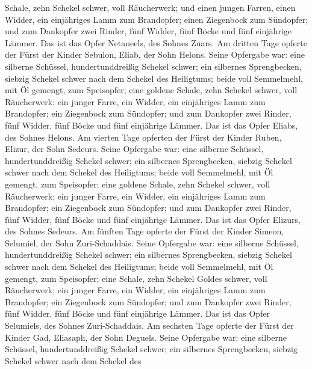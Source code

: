 Schale, zehn Schekel schwer, voll Räucherwerk;  und einen
jungen Farren, einen Widder, ein einjähriges Lamm zum Brandopfer;
 einen Ziegenbock zum Sündopfer;  und zum
Dankopfer zwei Rinder, fünf Widder, fünf Böcke und fünf einjährige
Lämmer. Das ist das Opfer Netaneels, des Sohnes Zuars. 
Am dritten Tage opferte der Fürst der Kinder Sebulon, Eliab, der Sohn
Helons.  Seine Opfergabe war: eine silberne Schüssel,
hundertunddreißig Schekel schwer; ein silbernes Sprengbecken, siebzig
Schekel schwer nach dem Schekel des Heiligtums; beide voll Semmelmehl,
mit Öl gemengt, zum Speisopfer;  eine goldene Schale,
zehn Schekel schwer, voll Räucherwerk;  ein junger Farre,
ein Widder, ein einjähriges Lamm zum Brandopfer;  ein
Ziegenbock zum Sündopfer;  und zum Dankopfer zwei Rinder,
fünf Widder, fünf Böcke und fünf einjährige Lämmer. Das ist das Opfer
Eliabs, des Sohnes Helons.  Am vierten Tage opferten der
Fürst der Kinder Ruben, Elizur, der Sohn Sedeurs.  Seine
Opfergabe war: eine silberne Schüssel, hundertunddreißig Schekel schwer;
ein silbernes Sprengbecken, siebzig Schekel schwer nach dem Schekel des
Heiligtums; beide voll Semmelmehl, mit Öl gemengt, zum Speisopfer;
 eine goldene Schale, zehn Schekel schwer, voll
Räucherwerk;  ein junger Farre, ein Widder, ein
einjähriges Lamm zum Brandopfer;  ein Ziegenbock zum
Sündopfer;  und zum Dankopfer zwei Rinder, fünf Widder,
fünf Böcke und fünf einjährige Lämmer. Das ist das Opfer Elizurs, des
Sohnes Sedeurs.  Am fünften Tage opferte der Fürst der
Kinder Simeon, Selumiel, der Sohn Zuri-Schaddais.  Seine
Opfergabe war: eine silberne Schüssel, hundertunddreißig Schekel schwer;
ein silbernes Sprengbecken, siebzig Schekel schwer nach dem Schekel des
Heiligtums; beide voll Semmelmehl, mit Öl gemengt, zum Speisopfer;
 eine Schale, zehn Schekel Goldes schwer, voll
Räucherwerk;  ein junger Farre, ein Widder, ein
einjähriges Lamm zum Brandopfer;  ein Ziegenbock zum
Sündopfer;  und zum Dankopfer zwei Rinder, fünf Widder,
fünf Böcke und fünf einjährige Lämmer. Das ist das Opfer Selumiels, des
Sohnes Zuri-Schaddais.  Am sechsten Tage opferte der
Fürst der Kinder Gad, Eliasaph, der Sohn Deguels.  Seine
Opfergabe war: eine silberne Schüssel, hundertunddreißig Schekel schwer;
ein silbernes Sprengbecken, siebzig Schekel schwer nach dem Schekel des

